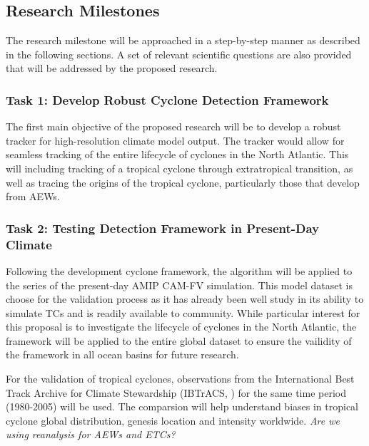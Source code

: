 \documentclass[11pt]{article}
\begin{document}
\subsection{Research Milestones} \label{sec:ResearchMilestones}

The research milestone will be approached in a step-by-step manner as described in the following sections. A set of relevant scientific questions are also provided that will be addressed by the proposed research.

\subsubsection{Task 1: Develop Robust Cyclone Detection Framework}
The first main objective of the proposed research will be to develop a robust tracker for high-resolution climate model output. The tracker would allow for seamless tracking of the entire lifecycle of cyclones in the North Atlantic. This will including tracking of a tropical cyclone through extratropical transition, as well as tracing the origins of the tropical cyclone, particularly those that develop from AEWs. 

\subsubsection{Task 2: Testing Detection Framework in Present-Day Climate}
Following the development cyclone framework, the algorithm will be applied to the series of the present-day AMIP CAM-FV simulation. This model dataset is choose for the validation process as it has already been well study in its ability to simulate TCs \citep{Bacmeister2014,Wehner2014} and is readily available to community. While particular interest for this proposal is to investigate the lifecycle of cyclones in the North Atlantic, the framework will be applied to the entire global dataset to ensure the vailidity of the framework in all ocean basins for future research. 

For the validation of tropical cyclones, observations from the International Best Track Archive for Climate Stewardship (IBTrACS, \citet{Knapp2010}) for the same time period (1980-2005) will be used. The comparsion will help understand biases in tropical cyclone global distribution, genesis location and intensity worldwide. \emph{Are we using reanalysis for AEWs and ETCs?}
\end{document}
